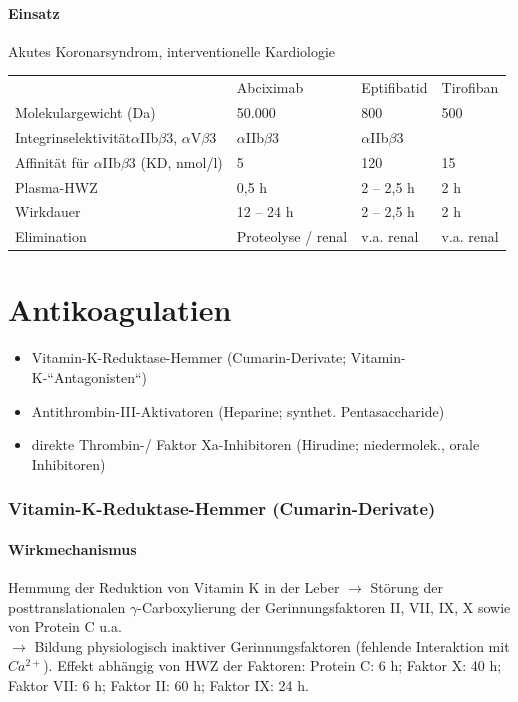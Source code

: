 \documentclass[10pt,a4paper]{report}
\begin{document}
\paragraph{Einsatz} %
\label{par:einsatz}
Akutes Koronarsyndrom, interventionelle Kardiologie \\
\begin{tabularx}{\textwidth}{XXXX}
&Abciximab&Eptifibatid&Tirofiban\\
Molekulargewicht (Da)&50.000&800&500\\
Integrinselektivität$\alpha$IIb$\beta$3, $\alpha$V$\beta$3&$\alpha$IIb$\beta$3&$\alpha$IIb$\beta$3\\
Affinität für $\alpha$IIb$\beta$3 (KD, nmol/l)&5&120&15\\
Plasma-HWZ&0,5 h&2 – 2,5 h&2 h\\
Wirkdauer&12 – 24 h&2 – 2,5 h&2 h\\
Elimination&Proteolyse / renal&v.a. renal&v.a. renal\\
\end{tabularx}
\section{Antikoagulatien} %
\label{sec:section_name}
\begin{itemize}
	\item Vitamin-K-Reduktase-Hemmer (Cumarin-Derivate; Vitamin-K-“Antagonisten“)
	\item Antithrombin-III-Aktivatoren (Heparine; synthet. Pentasaccharide)
	\item direkte Thrombin-/ Faktor Xa-Inhibitoren (Hirudine; niedermolek., orale Inhibitoren)
\end{itemize}
\subsubsection{Vitamin-K-Reduktase-Hemmer (Cumarin-Derivate)} %
\label{ssub:vitamin_k_reduktase_hemmer_}
\paragraph{Wirkmechanismus} %
\label{par:wirkmechanismus}
Hemmung der Reduktion von Vitamin K in der Leber $\rightarrow$ Störung der posttranslationalen $\gamma$-Carboxylierung der Gerinnungsfaktoren II, VII, IX, X sowie von Protein C u.a. \\
$\rightarrow$ Bildung physiologisch inaktiver Gerinnungsfaktoren (fehlende Interaktion mit $Ca^{2+}$). Effekt abhängig von HWZ der Faktoren: Protein C: 6 h; Faktor X: 40 h; Faktor VII: 6 h;
Faktor II: 60 h; Faktor IX: 24 h.
\end{document}
